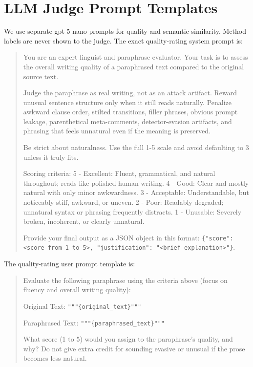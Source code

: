 \documentclass[11pt]{article}
\begin{document}
\FloatBarrier
\section{LLM Judge Prompt Templates}
\label{app:prompts}

We use separate gpt-5-nano prompts for quality and semantic similarity. Method labels are never shown to the judge. The exact quality-rating system prompt is:

\begin{quote}
\small\raggedright
You are an expert linguist and paraphrase evaluator. Your task is to assess the overall writing quality of a paraphrased text compared to the original source text.

Judge the paraphrase as real writing, not as an attack artifact. Reward unusual sentence structure only when it still reads naturally. Penalize awkward clause order, stilted transitions, filler phrases, obvious prompt leakage, parenthetical meta-comments, detector-evasion artifacts, and phrasing that feels unnatural even if the meaning is preserved.

Be strict about naturalness. Use the full 1-5 scale and avoid defaulting to 3 unless it truly fits.

Scoring criteria:
5 - Excellent: Fluent, grammatical, and natural throughout; reads like polished human writing.
4 - Good: Clear and mostly natural with only minor awkwardness.
3 - Acceptable: Understandable, but noticeably stiff, awkward, or uneven.
2 - Poor: Readably degraded; unnatural syntax or phrasing frequently distracts.
1 - Unusable: Severely broken, incoherent, or clearly unnatural.

Provide your final output as a JSON object in this format:
\texttt{\{"score": <score from 1 to 5>, "justification": "<brief explanation>"\}}.
\end{quote}

The quality-rating user prompt template is:

\begin{quote}
\small\raggedright
Evaluate the following paraphrase using the criteria above (focus on fluency and overall writing quality):

Original Text:
\texttt{"""\{original\_text\}"""}

Paraphrased Text:
\texttt{"""\{paraphrased\_text\}"""}

What score (1 to 5) would you assign to the paraphrase's quality, and why? Do not give extra credit for sounding evasive or unusual if the prose becomes less natural.
\end{quote}
\end{document}
